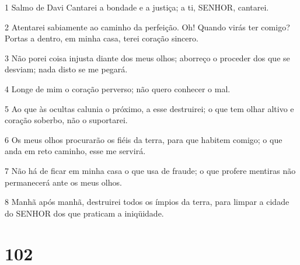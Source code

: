 \par 1 Salmo de Davi Cantarei a bondade e a justiça; a ti, SENHOR, cantarei.
\par 2 Atentarei sabiamente ao caminho da perfeição. Oh! Quando virás ter comigo? Portas a dentro, em minha casa, terei coração sincero.
\par 3 Não porei coisa injusta diante dos meus olhos; aborreço o proceder dos que se desviam; nada disto se me pegará.
\par 4 Longe de mim o coração perverso; não quero conhecer o mal.
\par 5 Ao que às ocultas calunia o próximo, a esse destruirei; o que tem olhar altivo e coração soberbo, não o suportarei.
\par 6 Os meus olhos procurarão os fiéis da terra, para que habitem comigo; o que anda em reto caminho, esse me servirá.
\par 7 Não há de ficar em minha casa o que usa de fraude; o que profere mentiras não permanecerá ante os meus olhos.
\par 8 Manhã após manhã, destruirei todos os ímpios da terra, para limpar a cidade do SENHOR dos que praticam a iniqüidade.

\chapter{102}

